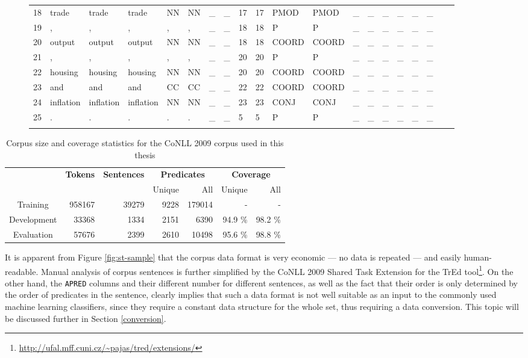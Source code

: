 \documentclass[12pt,notitlepage]{report}
\begin{document}
\begin{figure}[p]
\begin{center}
{\begin{tabular}{llllllllllllllllllll}
18 & trade & trade & trade & NN & NN & \_ & \_ & 17 & 17 & PMOD & PMOD & \_ & \_ & \_ & \_ & \_ & \_\\
19 & , & , & , & , & , & \_ & \_ & 18 & 18 & P & P & \_ & \_ & \_ & \_ & \_ & \_\\
20 & output & output & output & NN & NN & \_ & \_ & 18 & 18 & COORD & COORD & \_ & \_ & \_ & \_ & \_ & \_\\
21 & , & , & , & , & , & \_ & \_ & 20 & 20 & P & P & \_ & \_ & \_ & \_ & \_ & \_\\
22 & housing & housing & housing & NN & NN & \_ & \_ & 20 & 20 & COORD & COORD & \_ & \_ & \_ & \_ & \_ & \_\\
23 & and & and & and & CC & CC & \_ & \_ & 22 & 22 & COORD & COORD & \_ & \_ & \_ & \_ & \_ & \_\\
24 & inflation & inflation & inflation & NN & NN & \_ & \_ & 23 & 23 & CONJ & CONJ & \_ & \_ & \_ & \_ & \_ & \_\\
25 & . & . & . & . & . & \_ & \_ & 5 & 5 & P & P & \_ & \_ & \_ & \_ & \_ & \_\\
\\
\end{tabular}
}
\end{center}
\end{figure}

\begin{table}[p]
\caption{Corpus size and coverage statistics for the CoNLL 2009 corpus used in this thesis}\label{tab:corpus-stats}
\begin{center}
\begin{tabular}{|c|rrrrrr|}\hline
  & \multirow{2}{*}{\bf Tokens} & \multirow{2}{*}{\bf Sentences} & \multicolumn{2}{c}{\bf Predicates} & \multicolumn{2}{c|}{\bf Coverage} \\
 & & & Unique & All & Unique & All \\\hline
Training & 958167 & 39279 & 9228 & 179014 & - & - \\
Development & 33368 & 1334 & 2151 & 6390 & 94.9 \% & 98.2 \% \\
Evaluation & 57676 & 2399 & 2610 & 10498 & 95.6 \% & 98.8 \% \\\hline
\end{tabular}
\end{center}
\end{table}

It is apparent from Figure \ref{fig:st-sample} that the corpus data format is very economic --- no data is repeated --- and easily human-readable. Manual analysis of corpus sentences is further simplified by the CoNLL 2009 Shared Task Extension for the TrEd tool\footnote{\url{http://ufal.mff.cuni.cz/\~pajas/tred/extensions/}}. On the other hand, the \texttt{APRED} columns and their different number for different sentences, as well as the fact that their order is only determined by the order of predicates in the sentence, clearly implies that such a data format is not well suitable as an input to the commonly used machine learning classifiers, since they require a constant data structure for the whole set, thus requiring a data conversion. This topic will be discussed further in Section \ref{conversion}.
\end{document}
